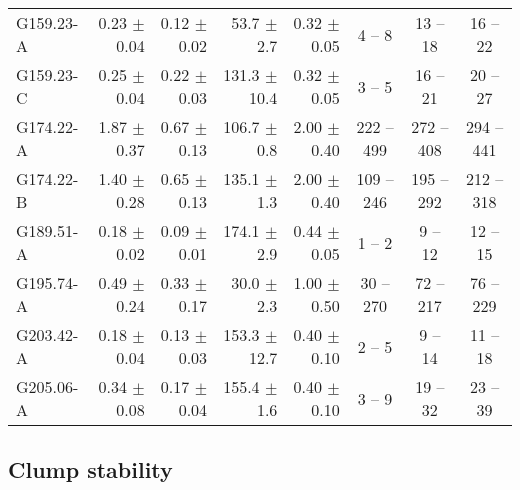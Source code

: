 \documentclass[printer]{aa}
\begin{document}
\begin{table*}[t]
\begin{tabular}{l r r r r c c c}
G159.23-A & 0.23 $\pm$ 0.04 & 0.12 $\pm$ 0.02 &  53.7 $\pm$   2.7 & 0.32 $\pm$ 0.05 &    4 --    8 &   13 --   18 &   16 --   22 \\
G159.23-C & 0.25 $\pm$ 0.04 & 0.22 $\pm$ 0.03 & 131.3 $\pm$  10.4 & 0.32 $\pm$ 0.05 &    3 --    5 &   16 --   21 &   20 --   27 \\
G174.22-A & 1.87 $\pm$ 0.37 & 0.67 $\pm$ 0.13 & 106.7 $\pm$   0.8 & 2.00 $\pm$ 0.40 &  222 --  499 &  272 --  408 &  294 --  441 \\
G174.22-B & 1.40 $\pm$ 0.28 & 0.65 $\pm$ 0.13 & 135.1 $\pm$   1.3 & 2.00 $\pm$ 0.40 &  109 --  246 &  195 --  292 &  212 --  318 \\
G189.51-A & 0.18 $\pm$ 0.02 & 0.09 $\pm$ 0.01 & 174.1 $\pm$   2.9 & 0.44 $\pm$ 0.05 &    1 --    2 &    9 --   12 &   12 --   15 \\
G195.74-A & 0.49 $\pm$ 0.24 & 0.33 $\pm$ 0.17 &  30.0 $\pm$   2.3 & 1.00 $\pm$ 0.50 &   30 --  270 &   72 --  217 &   76 --  229 \\
G203.42-A & 0.18 $\pm$ 0.04 & 0.13 $\pm$ 0.03 & 153.3 $\pm$  12.7 & 0.40 $\pm$ 0.10 &    2 --    5 &    9 --   14 &   11 --   18 \\
G205.06-A & 0.34 $\pm$ 0.08 & 0.17 $\pm$ 0.04 & 155.4 $\pm$   1.6 & 0.40 $\pm$ 0.10 &    3 --    9 &   19 --   32 &   23 --   39 \\
  \hline
			\end{tabular}%
	\label{stability}
\end{table*}

\subsection{Clump stability}
\label{clumpstab}
\end{document}
